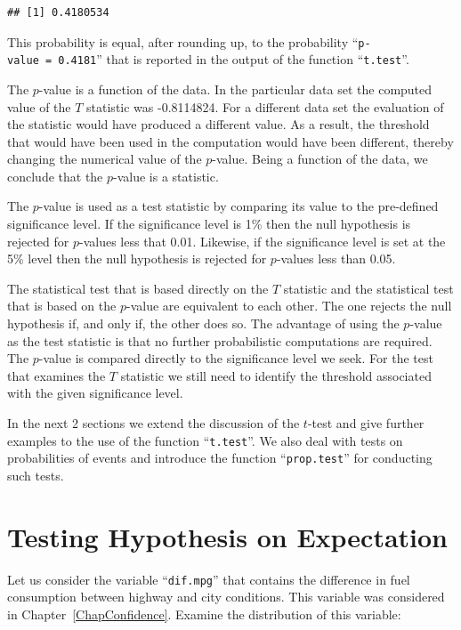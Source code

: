 \documentclass[
]{krantz}
\theoremstyle{definition}
\theoremstyle{definition}
\theoremstyle{definition}
\theoremstyle{remark}
\begin{document}
\begin{verbatim}
## [1] 0.4180534
\end{verbatim}

This probability is equal, after rounding up, to the probability
``\texttt{p-value\ =\ 0.4181}'' that is reported in the output of the function
``\texttt{t.test}''.

The \(p\)-value is a function of the data. In the particular data set the
computed value of the \(T\) statistic was -0.8114824. For a different data
set the evaluation of the statistic would have produced a different
value. As a result, the threshold that would have been used in the
computation would have been different, thereby changing the numerical
value of the \(p\)-value. Being a function of the data, we conclude that
the \(p\)-value is a statistic.

The \(p\)-value is used as a test statistic by comparing its value to the
pre-defined significance level. If the significance level is 1\% then the
null hypothesis is rejected for \(p\)-values less that 0.01. Likewise, if
the significance level is set at the 5\% level then the null hypothesis
is rejected for \(p\)-values less than 0.05.

The statistical test that is based directly on the \(T\) statistic and the
statistical test that is based on the \(p\)-value are equivalent to each
other. The one rejects the null hypothesis if, and only if, the other
does so. The advantage of using the \(p\)-value as the test statistic is
that no further probabilistic computations are required. The \(p\)-value
is compared directly to the significance level we seek. For the test
that examines the \(T\) statistic we still need to identify the threshold
associated with the given significance level.

In the next 2 sections we extend the discussion of the \(t\)-test and give
further examples to the use of the function ``\texttt{t.test}''. We also deal
with tests on probabilities of events and introduce the function
``\texttt{prop.test}'' for conducting such tests.

\hypertarget{testing-hypothesis-on-expectation}{%
\section{Testing Hypothesis on Expectation}\label{testing-hypothesis-on-expectation}}

Let us consider the variable ``\texttt{dif.mpg}'' that contains the difference in
fuel consumption between highway and city conditions. This variable was
considered in Chapter~\ref{ChapConfidence}. Examine the distribution of
this variable:
\end{document}
